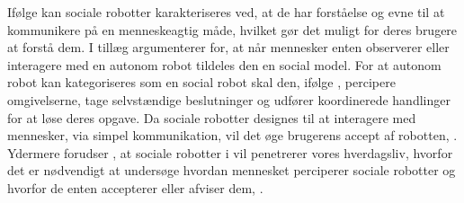 Ifølge \textcite[s. 1]{PDF:SharingALifeHarvey} kan sociale robotter karakteriseres ved, at de har forståelse og evne til at kommunikere på en menneskeagtig måde, hvilket gør det muligt for deres brugere at forstå dem. I tillæg argumenterer \textcite[s. 168]{PDF:TowardSociableRobots} for, at når mennesker enten observerer eller interagere med en autonom robot tildeles den en social model. For at autonom robot kan kategoriseres som en social robot skal den, ifølge \textcite[s. 168]{PDF:TowardSociableRobots}, percipere omgivelserne, tage selvstændige beslutninger og udfører koordinerede handlinger for at løse deres opgave. Da sociale robotter designes til at interagere med mennesker, via simpel kommunikation, vil det øge brugerens accept af robotten, \parencite[s. 1476]{PDF:ExploringInfluencingVariable}. Ydermere forudser \textcite[s. 1476]{PDF:ExploringInfluencingVariable}, at sociale robotter i vil penetrerer vores hverdagsliv, hvorfor det er nødvendigt at undersøge hvordan mennesket perciperer sociale robotter og hvorfor de enten accepterer eller afviser dem, \parencite[s. 1]{PDF:SharingALifeHarvey}.  



